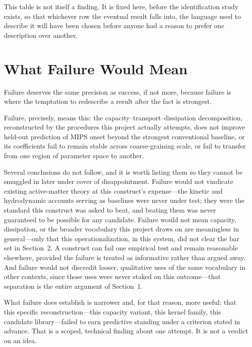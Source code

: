 \documentclass[11pt]{article}
\begin{document}
\noindent This table is not itself a finding. It is fixed here, before the identification study exists, so that whichever row the eventual result falls into, the language used to describe it will have been chosen before anyone had a reason to prefer one description over another.

\section{What Failure Would Mean}

Failure deserves the same precision as success, if not more, because failure is where the temptation to redescribe a result after the fact is strongest.

Failure, precisely, means this: the capacity--transport--dissipation decomposition, reconstructed by the procedures this project actually attempts, does not improve held-out prediction of MIPS onset beyond the strongest conventional baseline, or its coefficients fail to remain stable across coarse-graining scale, or fail to transfer from one region of parameter space to another.

Several conclusions do not follow, and it is worth listing them so they cannot be smuggled in later under cover of disappointment. Failure would not vindicate existing active-matter theory at this construct's expense---the kinetic and hydrodynamic accounts serving as baselines were never under test; they were the standard this construct was asked to beat, and beating them was never guaranteed to be possible for any candidate. Failure would not mean capacity, dissipation, or the broader vocabulary this project draws on are meaningless in general---only that this operationalization, in this system, did not clear the bar set in Section~2. A construct can fail one empirical test and remain reasonable elsewhere, provided the failure is treated as informative rather than argued away. And failure would not discredit looser, qualitative uses of the same vocabulary in other contexts, since those uses were never staked on this outcome---that separation is the entire argument of Section~1.

What failure does establish is narrower and, for that reason, more useful: that this specific reconstruction---this capacity variant, this kernel family, this candidate library---failed to earn predictive standing under a criterion stated in advance. That is a scoped, technical finding about one attempt. It is not a verdict on an idea.
\end{document}
